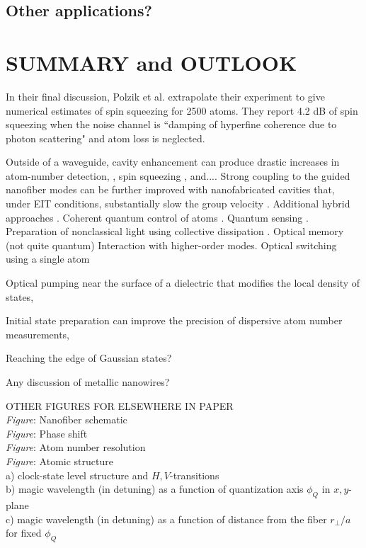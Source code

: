 \documentclass[preprint,aps,pra,onecolumn]{revtex4-1} %
\newcommand{\comment}[1]{{\color{Maroon} #1}}
\begin{document}
\subsection{Other applications?} 


\section{SUMMARY and OUTLOOK}

 
In their final discussion, Polzik et al. \cite{beguin_generation_2014} extrapolate their experiment to give numerical estimates of spin squeezing for 2500 atoms.  
They report 4.2 dB of spin squeezing when the noise channel is ``damping of hyperfine coherence due to photon scattering" and atom loss is neglected. 


Outside of a waveguide, cavity enhancement can produce drastic increases in atom-number detection, \cite{zhang_collective_2012}, spin squeezing \cite{bohnet_reduced_2014}, and....   
Strong coupling to the guided nanofiber modes can be further improved with nanofabricated cavities that, under EIT conditions, substantially slow the group velocity \cite{le_kien_intracavity_2009,wuttke_nanofiber_2012,nayak_optical_2014}.  Additional hybrid approaches \cite{hafezi_atomic_2012, yalla_cavity_2014}.  Coherent quantum control of atoms \cite{smith_quantum_2013-1}.  
Quantum sensing \cite{kumar_autler-townes_2015}.  Preparation of nonclassical light using collective dissipation \cite{gonzalez-tudela_deterministic_2015}.  
Optical memory (not quite quantum) \cite{sayrin_storage_2015, gouraud_demonstration_2015} Interaction with higher-order modes.  Optical switching using a single atom \cite{oshea_fiber-optical_2013} 

Optical pumping near the surface of a dielectric that modifies the local density of states, 

Initial state preparation can improve the precision of dispersive atom number measurements, 

Reaching the edge of Gaussian states?

\cite{scheel_directional_2015}
\comment{Any discussion of metallic nanowires?}

\comment{
OTHER FIGURES FOR ELSEWHERE IN PAPER \\
\emph{Figure}: Nanofiber schematic \\
\emph{Figure}: Phase shift \\
\emph{Figure}: Atom number resolution \\
\emph{Figure}: Atomic structure \\
a) clock-state level structure and $H,V$-transitions \\
b) magic wavelength (in detuning) as a function of quantization axis $\phi_Q$ in $x,y$-plane \\
c) magic wavelength (in detuning) as a function of distance from the fiber $r_\perp/a$ for fixed $\phi_Q$ 

}
\end{document}
